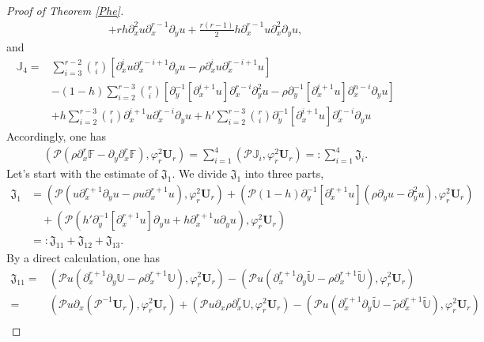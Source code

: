 \documentclass[10pt,a4paper]{amsart}
\begin{document}
\begin{proof}[Proof of Theorem \ref{Phe}]
\begin{align*}
  +rh\partial_{x}^{2}u\partial_{x}^{r-1}\partial_{y}u
  +\frac{r(r-1)}{2}h\partial_{x}^{r-1}u\partial_{x}^{2}\partial_{y}u,
\end{align*}
and
\begin{align*}
\mathbb{J}_{4}
=& \sum_{i=3}^{r-2}\binom{r}{i}[\partial_{x}^{i}u\partial_{x}^{r-i+1}\partial_{y}u-\rho\partial_{x}^{i}u\partial_{x}^{r-i+1}u]\\
 &-(1-h)\sum_{i=2}^{r-3}\binom{r}{i}\left[\partial_{y}^{-1}[\partial_{x}^{i+1}u]\partial_{x}^{r-i}\partial_{y}^{2}u-\rho\partial_{y}^{-1}[\partial_{x}^{i+1}u]\partial_{x}^{n-i}\partial_{y}u\right]\\
 &+h\sum_{i=2}^{r-3}\binom{r}{i}\partial_{x}^{i+1}u\partial_{x}^{r-i}\partial_{y}u
  +h'\sum_{i=2}^{r-3}\binom{r}{i}\partial_{y}^{-1}[\partial_{x}^{i+1}u]\partial_{x}^{r-i}\partial_{y}u
\end{align*}
Accordingly, one has
\begin{align*}
(\mathcal{P}(\rho\partial_{x}^{r}\mathbb{F}-\partial_{y}\partial_{x}^{r}\mathbb{F}),\varphi_{r}^{2}\mathbf{U}_{r})
= \sum_{i=1}^{4}(\mathcal{P}\mathbb{J}_{i},\varphi_{r}^{2}\mathbf{U}_{r})
=: \sum_{i=1}^{4}\mathfrak{J}_{i}.
\end{align*}
Let's start with the estimate of $\mathfrak{J}_{1}$. We divide $\mathfrak{J}_{1}$ into three parts,
\begin{align*}
\mathfrak{J}_{1}
&= (\mathcal{P}(u\partial_{x}^{r+1}\partial_{y}u-\rho u\partial_{x}^{r+1}u),\varphi_{r}^{2}\mathbf{U}_{r})
  +(\mathcal{P}(1-h)\partial_{y}^{-1}[\partial_{x}^{r+1}u](\rho\partial_{y}u-\partial_{y}^{2}u),\varphi_{r}^{2}\mathbf{U}_{r})\\
&\quad+(\mathcal{P}(h'\partial_{y}^{-1}[\partial_{x}^{r+1}u]\partial_{y}u+h\partial_{x}^{r+1}u\partial_{y}u),\varphi_{r}^{2}\mathbf{U}_{r})\\
&=: \mathfrak{J}_{11}+\mathfrak{J}_{12}+\mathfrak{J}_{13}.
\end{align*}
By a direct calculation, one has
\begin{align}\label{JJ11}
\mathfrak{J}_{11}
=& (\mathcal{P}u(\partial_{x}^{r+1}\partial_{y}\mathbb{U}-\rho \partial_{x}^{r+1}\mathbb{U}),\varphi_{r}^{2}\mathbf{U}_{r})
  -(\mathcal{P}u(\partial_{x}^{r+1}\partial_{y}\tilde{\mathbb{U}}-\rho \partial_{x}^{r+1}\tilde{\mathbb{U}}),\varphi_{r}^{2}\mathbf{U}_{r})\\
=& (\mathcal{P}u\partial_{x}(\mathcal{P}^{-1}\mathbf{U}_{r}),\varphi_{r}^{2}\mathbf{U}_{r})
  +(\mathcal{P}u\partial_{x}\rho\partial_{x}^{r}\mathbb{U},\varphi_{r}^{2}\mathbf{U}_{r})
  -(\mathcal{P}u(\partial_{x}^{r+1}\partial_{y}\tilde{\mathbb{U}}-\tilde{\rho}\partial_{x}^{r+1}\tilde{\mathbb{U}}),\varphi_{r}^{2}\mathbf{U}_{r})\nonumber\\

\end{align}
\end{proof}
\end{document}
